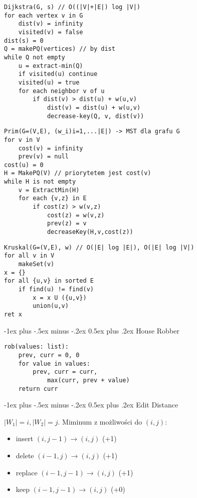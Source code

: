 \documentclass[landscape,a4paper]{article}
\makeatletter
\renewcommand{\section}{\@startsection{section}{1}{0mm}%
                                {-1ex plus -.5ex minus -.2ex}%
                                {0.5ex plus .2ex}%
                                {\normalfont\large\bfseries}}
\makeatother
\begin{document}
\begin{multicols}{5}
\begin{verbatim}
Dijkstra(G, s) // O((|V|+|E|) log |V|)
for each vertex v in G
    dist(v) = infinity
    visited(v) = false
dist(s) = 0
Q = makePQ(vertices) // by dist
while Q not empty
    u = extract-min(Q)
    if visited(u) continue
    visited(u) = true
    for each neighbor v of u
        if dist(v) > dist(u) + w(u,v)
            dist(v) = dist(u) + w(u,v)
            decrease-key(Q, v, dist(v))
\end{verbatim}

\begin{verbatim}
Prim(G=(V,E), (w_i)i=1,...|E|) -> MST dla grafu G
for v in V 
    cost(v) = infinity
    prev(v) = null
cost(u) = 0
H = MakePQ(V) // priorytetem jest cost(v)
while H is not empty
    v = ExtractMin(H)
    for each {v,z} in E
        if cost(z) > w(v,z)
            cost(z) = w(v,z)
            prev(z) = v
            decreaseKey(H,v,cost(z))
\end{verbatim}

\begin{verbatim}
Kruskal(G=(V,E), w) // O(|E| log |E|), O(|E| log |V|)
for all v in V
    makeSet(v)
x = {}
for all {u,v} in sorted E
    if find(u) != find(v)
        x = x U ({u,v})
        union(u,v)
ret x
\end{verbatim}

\section{House Robber}

\begin{verbatim}
rob(values: list):
    prev, curr = 0, 0
    for value in values:
        prev, curr = curr, 
            max(curr, prev + value)
    return curr
\end{verbatim}

\section{Edit Distance}

$|W_1|=i, |W_2|=j$. Miminum z możliwości do $(i,j)$:

\begin{itemize}
    \item insert $(i,j-1)\rightarrow(i,j)$ (+1)
    \item delete $(i-1,j)\rightarrow(i,j)$ (+1)
    \item replace $(i-1,j-1)\rightarrow(i,j)$ (+1)
    \item keep $(i-1,j-1)\rightarrow(i,j)$ (+0)
\end{itemize}


\end{multicols}
\end{document}
